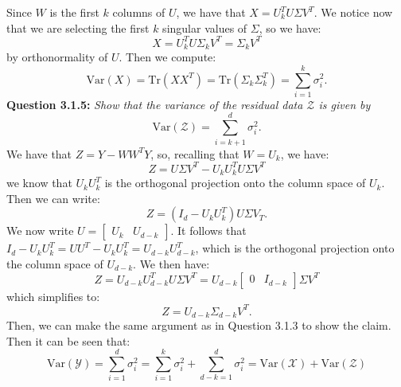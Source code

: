 \documentclass{article}
\begin{document}
\begin{multicols}{2}
    
    Since $W$ is the first $k$ columns of $U$, we have that $X=U^T_kU\Sigma V^T$. We notice now 
    that we are selecting the first $k$ singular values of $\Sigma$, so we have:
    \begin{equation*}
        X = U^T_kU\Sigma_kV^T = \Sigma_kV^T 
    \end{equation*}
    by orthonormality of $U$. Then we compute:
    \begin{equation*}
        \text{Var}(X) = \text{Tr}(XX^T) = \text{Tr}(\Sigma_k \Sigma_k^T) = \sum_{i=1}^k\sigma_i^2.
    \end{equation*}
    \noindent \textbf{Question 3.1.5:}  
    \textit{Show that the variance of the residual data \( \mathcal{Z} \) is given by}  
    \[
    \text{Var}(\mathcal{Z}) = \sum_{i=k+1}^d \sigma_i^2.
    \]
    We have that $Z = Y - WW^TY$, so, recalling that $W=U_k$, we have:
    \begin{equation*}
        Z =U \Sigma V^T - U_kU_k^TU\Sigma V^T
    \end{equation*}
    we know that $U_kU_k^T$ is the orthogonal projection onto the column space of $U_k$. Then we can write:
    \begin{equation*}
        Z = (I_d - U_kU_k^T)U \Sigma V_T.
    \end{equation*}
    We now write $U = \begin{bmatrix}
        U_k & U_{d-k}
    \end{bmatrix}$. It follows that  $I_d - U_kU_k^T = UU^T - U_kU_k^T  = U_{d-k}U_{d-k}^T$, which is the orthogonal projection onto the column space of $U_{d-k}$. We then have:
    \begin{equation*}
        Z = U_{d-k}U_{d-k}^TU \Sigma V^T = U_{d-k}\begin{bmatrix}
            0 & I_{d-k}
        \end{bmatrix} \Sigma V^T
    \end{equation*}
    which simplifies to:
    \begin{equation*}
        Z = U_{d-k} \Sigma_{d-k} V^T.
    \end{equation*}
    Then, we can make the same argument as in Question 3.1.3 to show the claim. 
    Then it can be seen that:
    \begin{equation*}
        \text{Var}(\mathcal{Y}) = \sum_{i=1}^d \sigma_i^2=  \sum_{i=1}^k \sigma_i^2 + \sum_{d-k=1}^d \sigma_i^2 =\text{Var}(\mathcal{X}) +\text{Var}(\mathcal{Z})
    \end{equation*}
    \newpage


\end{multicols}
\end{document}
